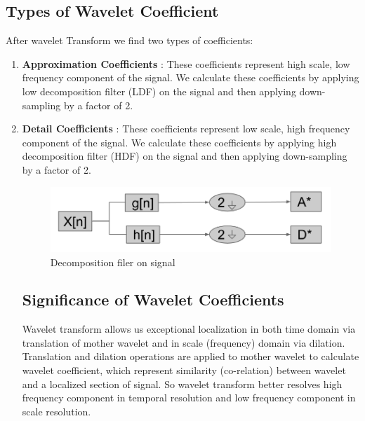 \documentclass[11pt]{report}
\begin{document}
\subsection{Types of Wavelet Coefficient}
After wavelet Transform we find two types of coefficients:
\begin{enumerate}
\item \textbf{Approximation Coefficients} : These coefficients represent high scale, low frequency component of the signal. We calculate these coefficients by applying low decomposition filter (LDF) on the signal and then applying down-sampling by a factor of 2.
\item \textbf{Detail Coefficients} : These coefficients represent low scale, high frequency component of the signal. We calculate these coefficients by applying high decomposition filter (HDF) on the signal and then applying down-sampling by a factor of 2.
\begin{figure}[h]
\centering
\includegraphics[scale=.5]{./images/dwtcoeff.png}
\caption{Decomposition filer on signal}
\end{figure}
\subsection{Significance of Wavelet Coefficients}
Wavelet transform allows us exceptional localization in both time domain via translation of mother wavelet and in scale (frequency) domain via dilation. Translation and dilation operations are applied to mother wavelet to calculate wavelet coefficient, which represent similarity (co-relation) between wavelet and a localized section of signal. So wavelet transform better resolves high frequency component in temporal resolution and low frequency component in scale resolution.





\end{enumerate}
\end{document}
